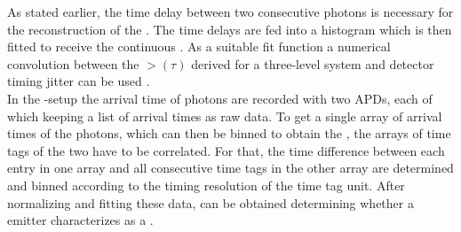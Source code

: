 		As stated earlier, the time delay between two consecutive photons is necessary for the reconstruction of the \gtf.
		The time delays are fed into a histogram which is then fitted to receive the continuous \gtf.
		As a suitable fit function a numerical convolution between the $\gt(\tau)$ derived for a three-level system and detector timing jitter can be used \cite{becker::16, neu::thesis, janine::thesis}.
		\\
		In the \HBT{}-setup the arrival time of photons are recorded with two APDs, each of which keeping a list of arrival times as raw data.
		To get a single array of arrival times of the photons, which can then be binned to obtain the \gtf, the arrays of time tags of the two \APDs have to be correlated.
		For that, the time difference between each entry in one array and all consecutive time tags in the other array are determined and binned according to the timing resolution of the time tag unit.
		After normalizing and fitting these data, \gtz can be obtained determining whether a emitter characterizes as a \sps.
